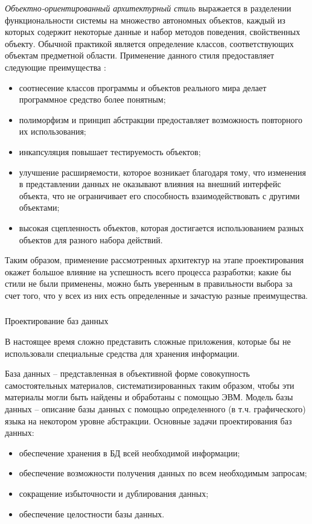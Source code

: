 \emph{Объектно-ориентированный архитектурный стиль} выражается в разделении функциональности системы на множество автономных объектов, каждый из которых содержит некоторые данные и набор методов поведения, свойственных объекту. Обычной практикой является определение классов, соответствующих объектам предметной области. Применение данного стиля предоставляет следующие преимущества \cite{application_architecture_guide}:

\begin{itemize}
	\item соотнесение классов программы и объектов реального мира делает программное средство более понятным;
	\item полиморфизм и принцип абстракции предоставляет возможность повторного их использования;
	\item инкапсуляция повышает тестируемость объектов;
	\item улучшение расширяемости, которое возникает благодаря тому, что изменения в представлении данных не оказывают влияния на внешний интерфейс объекта, что не ограничивает его способность взаимодействовать с другими объектами;
	\item высокая сцепленность объектов, которая достигается использованием разных объектов для разного набора действий.
\end{itemize}

Таким образом, применение рассмотренных архитектур на этапе проектирования окажет большое влияние на успешность всего процесса разработки; какие бы стили не были применены, можно быть уверенным в правильности выбора за счет того, что у всех из них есть определенные и зачастую разные преимущества.

\newpage
\subsubsection{} Проектирование баз данных
\label{sec:analysis:literature:db}

В настоящее время сложно представить сложные приложения, которые бы не использовали специальные средства для хранения информации.

База данных -- представленная в объективной форме совокупность самостоятельных материалов, систематизированных таким образом, чтобы эти материалы могли быть найдены и обработаны с помощью ЭВМ. Модель базы данных -- описание базы данных с помощью  определенного (в т.ч. графического) языка на некотором уровне абстракции.
%
Основные задачи проектирования баз данных:
\begin{itemize}
	\item обеспечение хранения в БД всей необходимой информации;
	\item обеспечение возможности получения данных по всем необходимым запросам;
	\item сокращение избыточности и дублирования данных;
	\item обеспечение целостности базы данных.
\end{itemize}

